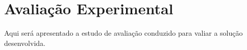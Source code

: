 \section{Avaliação Experimental}\label{sec:avaliacao-experimental}
Aqui será apresentado a estudo de avaliação conduzido para valiar a solução desenvolvida.